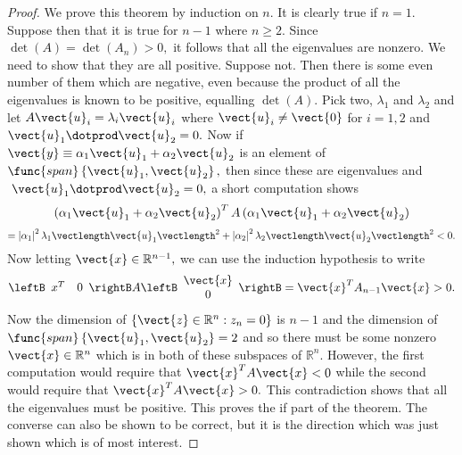 \begin{proof}
We prove this theorem by induction on $n.$ It is clearly
true if $n=1.$ Suppose then that it is true for $n-1$ where $n\geq 2$. Since 
$\det \left( A\right) =\det \left( A_{n}\right) >0,$ it follows that all the
eigenvalues are nonzero. We need to show that they are all positive. Suppose
not. Then there is some even number of them which are negative, even because
the product of all the eigenvalues is known to be positive, equalling $\det
\left( A\right) $. Pick two, $\lambda _{1}$ and $\lambda _{2}$ and let $A
\vect{u}_{i}=\lambda _{i}\vect{u}_{i}$ where $\vect{u}_{i}\neq \vect{0}$ for $
i=1,2$ and $\vect{u}_{1}\dotprod \vect{u}_{2}=0.$ Now if $\vect{y}\equiv \alpha
_{1}\vect{u}_{1}+\alpha _{2}\vect{u}_{2}$ is an element of $\func{span}\left\{ 
\vect{u}_{1},\vect{u}_{2}\right\} ,$ then since these are eigenvalues and $\ 
\vect{u}_{1}\dotprod \vect{u}_{2}=0,$ a short computation shows 
\begin{equation*}
\left( \alpha _{1}\vect{u}_{1}+\alpha _{2}\vect{u}_{2}\right) ^{T}A\left(
\alpha _{1}\vect{u}_{1}+\alpha _{2}\vect{u}_{2}\right)
\end{equation*}
\begin{equation*}
=\left\vert \alpha _{1}\right\vert ^{2}\lambda _{1}\vectlength \vect{u}
_{1}\vectlength ^{2}+\left\vert \alpha _{2}\right\vert ^{2}\lambda
_{2}\vectlength \vect{u}_{2}\vectlength ^{2}<0.
\end{equation*}
Now letting $\vect{x}\in \mathbb{R}^{n-1},$ we can use the induction
hypothesis to write 
\begin{equation*}
\leftB
\begin{array}{cc}
x^{T} & 0
\end{array}
\rightB A\leftB 
\begin{array}{c}
\vect{x} \\ 
0
\end{array}
\rightB =\vect{x}^{T}A_{n-1}\vect{x}>0.
\end{equation*}
Now the dimension of $\left\{ \vect{z}\in \mathbb{R}^{n}:z_{n}=0\right\} $ is 
$n-1$ and the dimension of $\func{span}\left\{ \vect{u}_{1},\vect{u}
_{2}\right\} =2$ and so there must be some nonzero $\vect{x}\in \mathbb{R}
^{n} $ which is in both of these subspaces of $\mathbb{R}^{n}$. However, the
first computation would require that $\vect{x}^{T}A\vect{x}<0$ while the
second would require that $\vect{x}^{T}A\vect{x}>0.$ This contradiction shows
that all the eigenvalues must be positive. This proves the if part of the
theorem. The converse can also be shown to be correct, but it is the
direction which was just shown which is of most interest. 
\end{proof}

